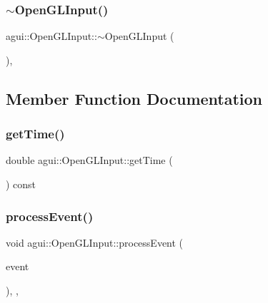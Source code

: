 \subsubsection{\texorpdfstring{$\sim$\+Open\+G\+L\+Input()}{~OpenGLInput()}}
{\footnotesize\ttfamily agui\+::\+Open\+G\+L\+Input\+::$\sim$\+Open\+G\+L\+Input (\begin{DoxyParamCaption}{ }\end{DoxyParamCaption})\hspace{0.3cm}{\ttfamily [virtual]}, {\ttfamily [default]}}



\subsection{Member Function Documentation}
\mbox{\label{classagui_1_1_open_g_l_input_afff68e181f8d772a642ecb8de48833db}} 
\subsubsection{\texorpdfstring{get\+Time()}{getTime()}}
{\footnotesize\ttfamily double agui\+::\+Open\+G\+L\+Input\+::get\+Time (\begin{DoxyParamCaption}{ }\end{DoxyParamCaption}) const\hspace{0.3cm}{\ttfamily [override]}}

\mbox{\label{classagui_1_1_open_g_l_input_aeb8c519c7fb7791295531b12948d4390}} 
\subsubsection{\texorpdfstring{process\+Event()}{processEvent()}}
{\footnotesize\ttfamily void agui\+::\+Open\+G\+L\+Input\+::process\+Event (\begin{DoxyParamCaption}\item[{const \mbox{\hyperlink{structec_1_1_input_event}{ec\+::\+Input\+Event}} \&}]{event }\end{DoxyParamCaption})\hspace{0.3cm}{\ttfamily [override]}, {\ttfamily [protected]}, {\ttfamily [virtual]}}



